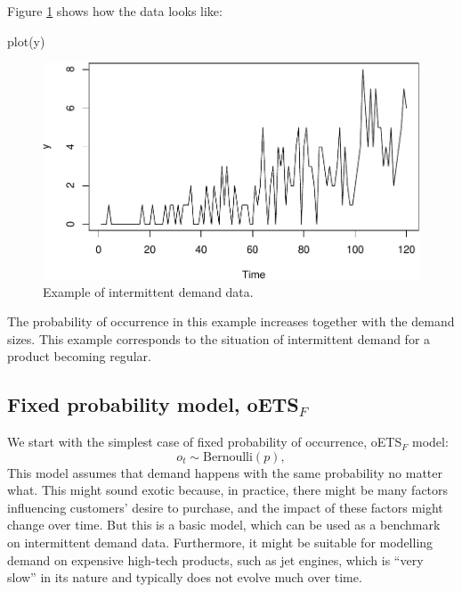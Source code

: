 \documentclass[
]{book}
\newenvironment{Shaded}{\begin{snugshade}}{\end{snugshade}}
\newcommand{\FunctionTok}[1]{\textcolor[rgb]{0.00,0.00,0.00}{#1}}
\newcommand{\NormalTok}[1]{#1}
\theoremstyle{definition}
\theoremstyle{definition}
\theoremstyle{definition}
\theoremstyle{definition}
\theoremstyle{remark}
\begin{document}
Figure \ref{fig:intermittentExamplePlot} shows how the data looks like:

\begin{Shaded}
\begin{Highlighting}[]
\FunctionTok{plot}\NormalTok{(y)}
\end{Highlighting}
\end{Shaded}

\begin{figure}
\centering
\includegraphics{Svetunkov--2022----ADAM_files/figure-latex/intermittentExamplePlot-1.pdf}
\caption{\label{fig:intermittentExamplePlot}Example of intermittent demand data.}
\end{figure}

The probability of occurrence in this example increases together with the demand sizes. This example corresponds to the situation of intermittent demand for a product becoming regular.

\hypertarget{fixed-probability-model-oets_f}{%
\subsection{\texorpdfstring{Fixed probability model, oETS\(_F\)}{Fixed probability model, oETS\_F}}\label{fixed-probability-model-oets_f}}

We start with the simplest case of fixed probability of occurrence, oETS\(_F\) model:
\begin{equation}
o_t \sim \text{Bernoulli}(p) ,
\label{eq:oETSFixed}
\end{equation}
This model assumes that demand happens with the same probability no matter what. This might sound exotic because, in practice, there might be many factors influencing customers' desire to purchase, and the impact of these factors might change over time. But this is a basic model, which can be used as a benchmark on intermittent demand data. Furthermore, it might be suitable for modelling demand on expensive high-tech products, such as jet engines, which is ``very slow'' in its nature and typically does not evolve much over time.
\end{document}
